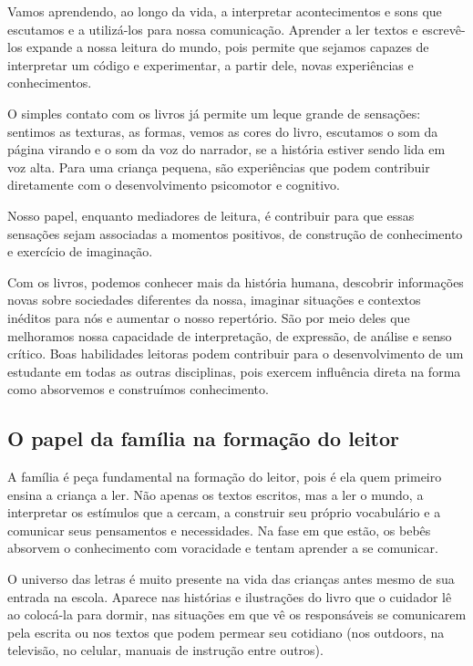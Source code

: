 \documentclass[11pt]{extarticle}
\begin{document}
Vamos aprendendo, ao longo da vida, a interpretar acontecimentos 
e sons que escutamos e a utilizá-los para nossa comunicação. Aprender a ler textos e 
escrevê-los expande a nossa leitura do mundo, pois permite que sejamos capazes de 
interpretar um código e experimentar, a partir dele, novas experiências e conhecimentos. 

O simples contato com os livros já permite um leque grande de sensações: 
sentimos as texturas, as formas, vemos as cores do livro, escutamos o som da página 
virando e o som da voz do narrador, se a história estiver sendo lida em voz alta. Para uma 
criança pequena, são experiências que podem contribuir diretamente com o desenvolvimento psicomotor 
e cognitivo. 

Nosso papel, enquanto mediadores de leitura, é contribuir para que essas 
sensações sejam associadas a momentos positivos, de construção de 
conhecimento e exercício de imaginação. 

Com os livros, podemos conhecer mais da história humana, descobrir informações 
novas sobre sociedades diferentes da nossa, imaginar situações e contextos inéditos 
para nós e aumentar o nosso repertório. São por meio deles que melhoramos nossa 
capacidade de interpretação, de expressão, de análise e senso crítico. Boas habilidades 
leitoras podem contribuir para o desenvolvimento de um estudante em todas as outras 
disciplinas, pois exercem influência direta na forma como absorvemos e 
construímos conhecimento.


\subsection{O papel da família na formação do leitor}
A família é peça fundamental na formação do leitor, pois é ela quem primeiro 
ensina a criança a ler. Não apenas os textos escritos, mas a ler o mundo, a 
interpretar os estímulos que a cercam, a construir seu próprio vocabulário e a 
comunicar seus pensamentos e necessidades. Na fase em que estão, os bebês 
absorvem o conhecimento com voracidade e tentam aprender a se comunicar. 

O universo das letras é muito presente na vida das crianças antes mesmo de sua 
entrada na escola. Aparece nas histórias e ilustrações do livro que o cuidador 
lê ao colocá-la para dormir, nas situações em que vê os responsáveis se comunicarem 
pela escrita ou nos textos que podem permear seu cotidiano (nos outdoors, na 
televisão, no celular, manuais de instrução entre outros). 
\end{document}
